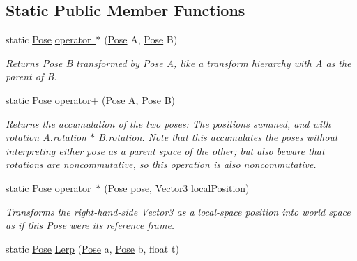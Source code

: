 \subsection*{Static Public Member Functions}
\begin{DoxyCompactItemize}
\item 
static \mbox{\hyperlink{struct_leap_1_1_unity_1_1_pose}{Pose}} \mbox{\hyperlink{struct_leap_1_1_unity_1_1_pose_adc1395f4c9a4caef84c6986ce49c7ab7}{operator $\ast$}} (\mbox{\hyperlink{struct_leap_1_1_unity_1_1_pose}{Pose}} A, \mbox{\hyperlink{struct_leap_1_1_unity_1_1_pose}{Pose}} B)
\begin{DoxyCompactList}\small\item\em Returns \mbox{\hyperlink{struct_leap_1_1_unity_1_1_pose}{Pose}} B transformed by \mbox{\hyperlink{struct_leap_1_1_unity_1_1_pose}{Pose}} A, like a transform hierarchy with A as the parent of B. \end{DoxyCompactList}\item 
static \mbox{\hyperlink{struct_leap_1_1_unity_1_1_pose}{Pose}} \mbox{\hyperlink{struct_leap_1_1_unity_1_1_pose_a26dee98a2b5f124aad5f1c56c21a5e1b}{operator+}} (\mbox{\hyperlink{struct_leap_1_1_unity_1_1_pose}{Pose}} A, \mbox{\hyperlink{struct_leap_1_1_unity_1_1_pose}{Pose}} B)
\begin{DoxyCompactList}\small\item\em Returns the accumulation of the two poses\+: The positions summed, and with rotation A.\+rotation $\ast$ B.\+rotation. Note that this accumulates the poses without interpreting either pose as a parent space of the other; but also beware that rotations are noncommutative, so this operation is also noncommutative. \end{DoxyCompactList}\item 
static \mbox{\hyperlink{struct_leap_1_1_unity_1_1_pose}{Pose}} \mbox{\hyperlink{struct_leap_1_1_unity_1_1_pose_a1f7c15fc1732e76b76068aa316f58dbd}{operator $\ast$}} (\mbox{\hyperlink{struct_leap_1_1_unity_1_1_pose}{Pose}} pose, Vector3 local\+Position)
\begin{DoxyCompactList}\small\item\em Transforms the right-\/hand-\/side Vector3 as a local-\/space position into world space as if this \mbox{\hyperlink{struct_leap_1_1_unity_1_1_pose}{Pose}} were its reference frame. \end{DoxyCompactList}\item 
static \mbox{\hyperlink{struct_leap_1_1_unity_1_1_pose}{Pose}} \mbox{\hyperlink{struct_leap_1_1_unity_1_1_pose_aac1241e7aec5379dc1aa001526532016}{Lerp}} (\mbox{\hyperlink{struct_leap_1_1_unity_1_1_pose}{Pose}} a, \mbox{\hyperlink{struct_leap_1_1_unity_1_1_pose}{Pose}} b, float t)

\end{DoxyCompactItemize}
